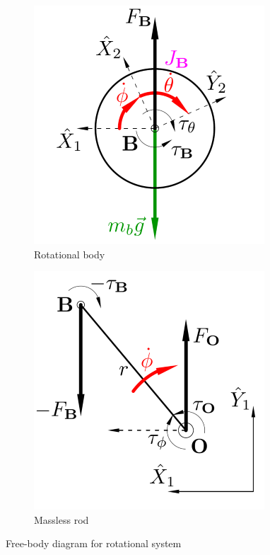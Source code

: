 \begin{figure}[htbp]
\centering
\begin{subfigure}{0.43\textwidth}
\centering
\includegraphics[width=\textwidth]{figs/lemma-a}
\caption{Rotational body}
\label{fig:lemma-a}
\end{subfigure}
\begin{subfigure}{0.43\textwidth}
\centering
\includegraphics[width=\textwidth]{figs/lemma-b}
\caption{Massless rod}
\label{fig:lemma-b}
\end{subfigure}
\caption{Free-body diagram for rotational system}
\label{fig:lemma}
\vspace{-12pt}
\end{figure}
